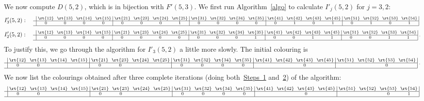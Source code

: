 \begin{exam}\label{ex:D52}
We now compute $D(5,2)$, which is in bijection with $F'(5,3)$. We
first run Algorithm~\ref{algo} to calculate
$I'_j(5,2)$ for $j=3,2$:
\[
 I'_3(5,2): \quad
\text{\setlength{\arraycolsep}{2.7pt}\scriptsize
$\displaystyle 
\begin{array}{c|cccc|cccc|cccc|cccc|cccc|}
 &\rt{12}&\rt{13}&\rt{14}&\rt{15}&\rt{21} &\rt{23}&\rt{24}&\rt{25}
 &\rt{31}&\rt{32} &\rt{34}&\rt{35}&\rt{41}&\rt{42}&\rt{43} &\rt{45} 
 &\rt{51}&\rt{52}&\rt{53} &\rt{54} \\ \hline
 &0&0&0	&0	&0&0&0	&1	 &0&0&0&0	&0&1&0&1 &0&1 &0&1
 \\ 
 \hline
\end{array}\; $} 
\]
\[
 I'_2(5,2): \quad
\text{\setlength{\arraycolsep}{2.7pt}\scriptsize
$\displaystyle 
\begin{array}{c|cccc|cccc|cccc|cccc|cccc|}
 &\rt{12}&\rt{13}&\rt{14}&\rt{15}&\rt{21} &\rt{23}&\rt{24}&\rt{25}&\rt{31}&\rt{32} &\rt{34}&\rt{35}&\rt{41}&\rt{42}&\rt{43} &\rt{45} 
 &\rt{51}&\rt{52}&\rt{53} &\rt{54} \\ \hline
 &0&0&0	&0	 &0&0&0&0&0&0&0	&1	&0&0&1&1	&0&0 &1&1
 \\ 
 \hline
\end{array}\;.$} 
\]
To justify this, we go through the algorithm for $I'_3(5,2)$ a little
more slowly. The initial colouring is
 \[ 
\text{\setlength{\arraycolsep}{2.7pt}\scriptsize
$\displaystyle 
\begin{array}{c|cccc|cccc|cccc|cccc|cccc|}
 &\rt{12}&\rt{13}&\rt{14}&\rt{15}&\rt{21} &\rt{23}&\rt{24}
 &\rt{25}&\rt{31}&\rt{32} &\rt{34}&\rt{35}&\rt{41}&\rt{42}&\rt{43} &\rt{45} 
 &\rt{51}&\rt{52}&\rt{53} &\rt{54} \\ \hline 
 &0&0&	&	&0&0&&	&0	&0&0&0	&	&&0&	& &&0&	\\ 
 \hline
\end{array}\; .$}
\] 
We now list the colourings obtained after three complete iterations
(doing both~\hyperlink{prop6.13_S1}{Steps~1} and~\hyperlink{prop6.13_S2}{2}) of the algorithm:
 \[ 
\text{\setlength{\arraycolsep}{2.7pt}\scriptsize
$\displaystyle 
\begin{array}{c|cccc|cccc|cccc|cccc|cccc|}
 &\rt{12}&\rt{13}&\rt{14}&\rt{15}&\rt{21} &\rt{23}&\rt{24}&\rt{25}&\rt{31}&\rt{32} &\rt{34}&\rt{35}&\rt{41}&\rt{42}&\rt{43} &\rt{45} 
 &\rt{51}&\rt{52}&\rt{53} &\rt{54} \\ \hline 
 &0&0&		&	&0&0&&	&0	&0&0&0	&	&&0&	&		&&0&1			\\ 
 \hline
\end{array}\;$} 
\]
\end{exam}
